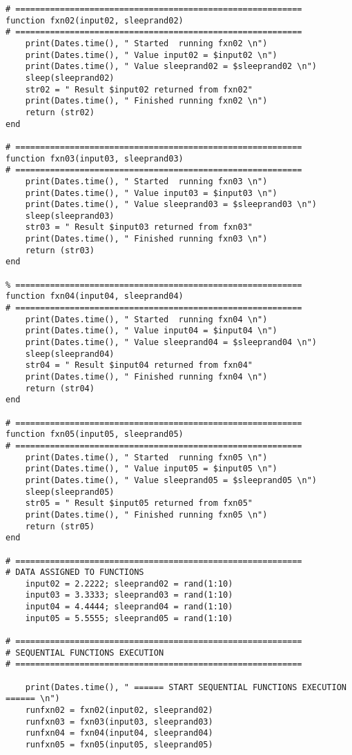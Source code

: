 \begin{lstlisting}[caption={App4-Julia Parallel Programming Codes}, label=App4-Julia Parallel Programming Codes]
# ==========================================================
function fxn02(input02, sleeprand02)
# ==========================================================
	print(Dates.time(), " Started  running fxn02 \n")
	print(Dates.time(), " Value input02 = $input02 \n")
	print(Dates.time(), " Value sleeprand02 = $sleeprand02 \n")
	sleep(sleeprand02)
	str02 = " Result $input02 returned from fxn02"  
	print(Dates.time(), " Finished running fxn02 \n")
	return (str02)	
end 

# ==========================================================
function fxn03(input03, sleeprand03)
# ==========================================================
	print(Dates.time(), " Started  running fxn03 \n")
	print(Dates.time(), " Value input03 = $input03 \n")
	print(Dates.time(), " Value sleeprand03 = $sleeprand03 \n")
	sleep(sleeprand03)
	str03 = " Result $input03 returned from fxn03"  
	print(Dates.time(), " Finished running fxn03 \n")
	return (str03)	
end 

% ==========================================================
function fxn04(input04, sleeprand04)
# ==========================================================
	print(Dates.time(), " Started  running fxn04 \n")
	print(Dates.time(), " Value input04 = $input04 \n")
	print(Dates.time(), " Value sleeprand04 = $sleeprand04 \n")
	sleep(sleeprand04)
	str04 = " Result $input04 returned from fxn04"  
	print(Dates.time(), " Finished running fxn04 \n")
	return (str04)	
end 

# ==========================================================
function fxn05(input05, sleeprand05)
# ==========================================================
	print(Dates.time(), " Started  running fxn05 \n")
	print(Dates.time(), " Value input05 = $input05 \n")
	print(Dates.time(), " Value sleeprand05 = $sleeprand05 \n")
	sleep(sleeprand05)
	str05 = " Result $input05 returned from fxn05"  
	print(Dates.time(), " Finished running fxn05 \n")
	return (str05)	
end 

# ==========================================================
# DATA ASSIGNED TO FUNCTIONS
	input02 = 2.2222; sleeprand02 = rand(1:10)
	input03 = 3.3333; sleeprand03 = rand(1:10)
	input04 = 4.4444; sleeprand04 = rand(1:10)
	input05 = 5.5555; sleeprand05 = rand(1:10)
	
# ==========================================================
# SEQUENTIAL FUNCTIONS EXECUTION
# ==========================================================

	print(Dates.time(), " ====== START SEQUENTIAL FUNCTIONS EXECUTION ====== \n")
	runfxn02 = fxn02(input02, sleeprand02)
	runfxn03 = fxn03(input03, sleeprand03)
	runfxn04 = fxn04(input04, sleeprand04)
	runfxn05 = fxn05(input05, sleeprand05)


\end{lstlisting}
